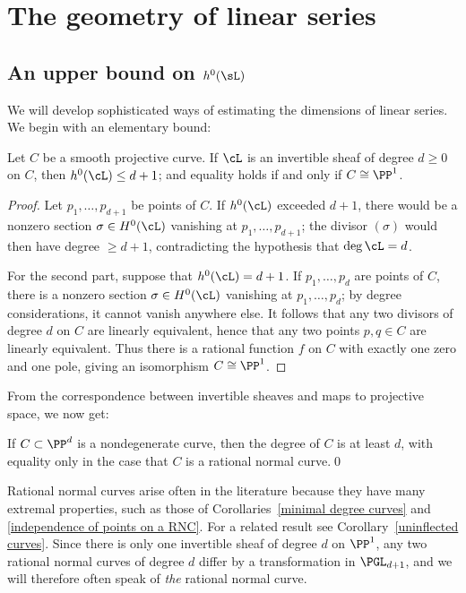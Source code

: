 \section{The geometry of linear series}

\subsection*{An upper bound on $h^0(\sL)$}

We will develop sophisticated ways of estimating the dimensions of linear series. We begin with an elementary bound:

\begin{theorem}\label{characterization of P1}
Let $C$ be a smooth projective curve. If $\cL$ is an invertible sheaf of degree $d\geq 0$ on $C$, then $h^0(\cL)\leq d+1$; and
equality holds if and only if $C \cong \PP^1$.
\end{theorem}

\begin{proof}
Let $p_1,\dots,p_{d+1}$ be
points of $C$. If $h^0(\cL)$
exceeded $d+1$,
there would be a nonzero section
$\sigma \in H^0(\cL)$ vanishing at $p_1,\dots,p_{d+1}$; the divisor
$(\sigma)$ would then have degree $\geq d+1$, contradicting the
hypothesis that $\deg \cL = d$.

For the second part, suppose that $h^0(\cL) = d+1$. If
$p_1,\dots,p_{d}$ are points of $C$, there is a nonzero section
$\sigma \in H^0(\cL)$ vanishing at $p_1,\dots,p_{d}$; by degree
considerations, it cannot vanish anywhere else. It follows that any
two divisors of degree $d$ on $C$ are linearly equivalent, hence that
any two points $p,q \in C$ are linearly equivalent. Thus there is a
rational function $f$ on $C$ with exactly one zero and one pole,
giving an isomorphism $C \cong \PP^1$.
 \end{proof}

From the correspondence between invertible sheaves and maps to projective space, we now get:
\begin{corollary}\label{minimal degree curves}
If $C\subset \PP^d$ is a  nondegenerate curve, then
the degree of $C$
is at least $d$,
with equality only in the case
that $C$ is a rational normal curve.\qed
\end{corollary}

Rational normal curves arise often in the literature because they have many extremal properties, such as those of Corollaries~\ref{minimal degree curves} and \ref{independence of points on a RNC}. For a related result see Corollary~\ref{uninflected curves}. Since there is only
one invertible sheaf of degree $d$ on $\PP^1$,
any two rational normal curves of degree $d$ differ by a transformation in $\PGL_{d+1}$,
and we will therefore often speak of \emph{the}
rational normal curve.
%

